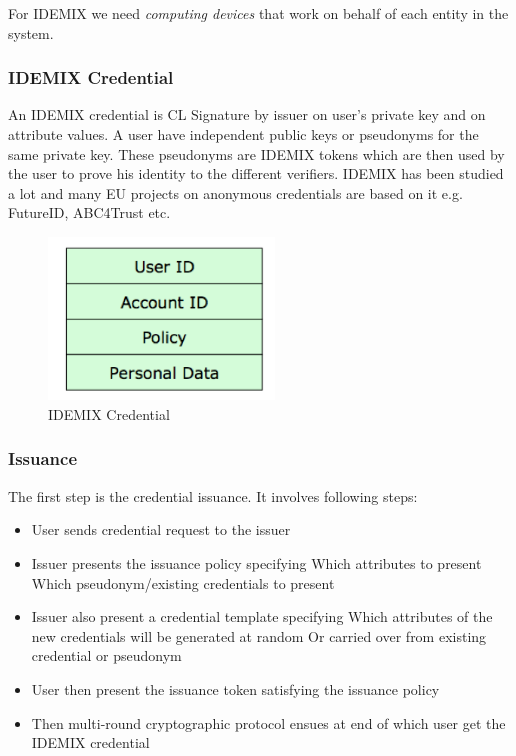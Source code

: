 For IDEMIX we need \textit{computing devices} that work on behalf of each entity in the system.
\subsubsection{IDEMIX Credential}
An IDEMIX credential is CL Signature by issuer on user's private key and on attribute values. A user have independent public keys or pseudonyms for the same private key. These pseudonyms are IDEMIX tokens which are then used by the user to prove his identity to the different verifiers. IDEMIX has been studied a lot and many EU projects on anonymous credentials are based on it e.g. FutureID\cite{rossnagel2012futureid}, ABC4Trust\cite{sabouri2012attribute} etc.
\begin{figure}[h]
	\centering
	\includegraphics[width=170pt]{figures/Credential}
	\caption{IDEMIX Credential}
	\label{fig:Credential}
\end{figure}
\subsubsection{Issuance}
The first step is the credential issuance. It involves following steps:
\begin{itemize}
	\item User sends credential request to the issuer
	\item Issuer presents the issuance policy specifying
		\subitem Which attributes to present
		\subitem Which pseudonym/existing credentials to present
	\item Issuer also present a credential template specifying
		\subitem Which attributes of the new credentials will be generated at random
		\subitem Or carried over from existing credential or pseudonym
	\item User then present the issuance token satisfying the issuance policy
	\item Then multi-round cryptographic protocol ensues at end of which user get the IDEMIX credential
\end{itemize}
